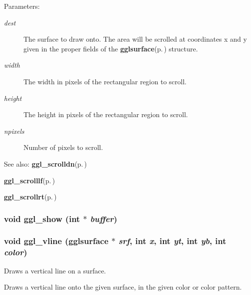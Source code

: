 \begin{Desc}
\item[Parameters:]
\begin{description}
\item[{\em dest}]The surface to draw onto. The area will be scrolled at coordinates x and y given in the proper fields of the {\bf gglsurface}{\rm (p.\,\pageref{structgglsurface})} structure. \item[{\em width}]The width in pixels of the rectangular region to scroll. \item[{\em height}]The height in pixels of the rectangular region to scroll. \item[{\em npixels}]Number of pixels to scroll.\end{description}
\end{Desc}
\begin{Desc}
\item[See also:]{\bf ggl\_\-scrolldn}{\rm (p.\,\pageref{ggl_8h_a23})} 

{\bf ggl\_\-scrolllf}{\rm (p.\,\pageref{ggl_8h_a24})} 

{\bf ggl\_\-scrollrt}{\rm (p.\,\pageref{ggl_8h_a25})} \end{Desc}
\subsubsection{\setlength{\rightskip}{0pt plus 5cm}void ggl\_\-show (int $\ast$ {\em buffer})}\label{ggl_8h_a12}


\subsubsection{\setlength{\rightskip}{0pt plus 5cm}void ggl\_\-vline ({\bf gglsurface} $\ast$ {\em srf}, int {\em x}, int {\em yt}, int {\em yb}, int {\em color})}\label{ggl_8h_a16}


Draws a vertical line on a surface. 

Draws a vertical line onto the given surface, in the given color or color pattern.

